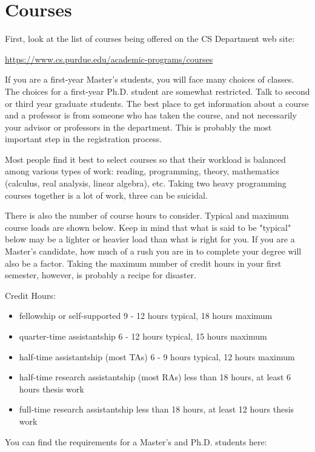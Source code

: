 \section{Courses}

First, look at the list of courses being offered on the CS Department web site:

\centerline{\url{https://www.cs.purdue.edu/academic-programs/courses}}
\vspace{\baselineskip}

If you are a first-year Master's students, you will face many choices of classes. The choices for a first-year Ph.D. student are somewhat restricted. Talk to second or third year graduate students. The best place to get information about a course and a professor is from someone who has taken the course, and not necessarily your advisor or professors in the department. This is probably the most important step in the registration process.

Most people find it best to select courses so that their workload is balanced among various types of work: reading, programming, theory, mathematics (calculus, real analysis, linear algebra), etc. Taking two heavy programming courses together is a lot of work, three can be suicidal.

There is also the number of course hours to consider. Typical and maximum course loads are shown below. Keep in mind that what is said to be "typical" below may be a lighter or heavier load than what is right for you. If you are a Master's candidate, how much of a rush you are in to complete your degree will also be a factor. Taking the maximum number of credit hours in your first semester, however, is probably a recipe for disaster.

Credit Hours:
\begin{itemize}
	\item fellowship or self-supported 9 - 12 hours typical, 18 hours maximum
	\item quarter-time assistantship 6 - 12 hours typical, 15 hours maximum
	\item half-time assistantship (most TAs) 6 - 9 hours typical, 12 hours maximum
	\item half-time research assistantship (most RAs) less than 18 hours, at least 6 hours thesis work
	\item full-time research assistantship less than 18 hours, at least 12 hours thesis work
\end{itemize}

You can find the requirements for a Master's and Ph.D. students here:

